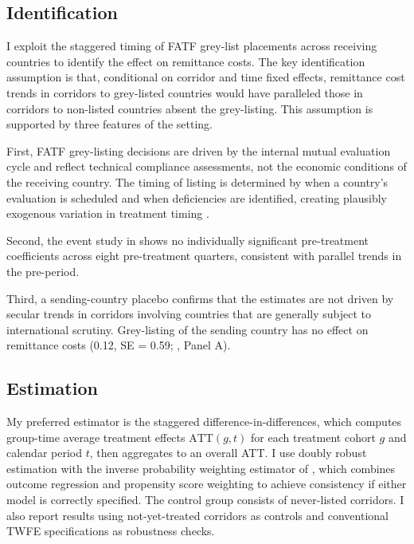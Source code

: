 \documentclass[12pt]{article}
\begin{document}
\subsection{Identification}

I exploit the staggered timing of FATF grey-list placements across receiving countries to identify the effect on remittance costs. The key identification assumption is that, conditional on corridor and time fixed effects, remittance cost trends in corridors to grey-listed countries would have paralleled those in corridors to non-listed countries absent the grey-listing. This assumption is supported by three features of the setting.

First, FATF grey-listing decisions are driven by the internal mutual evaluation cycle and reflect technical compliance assessments, not the economic conditions of the receiving country. The timing of listing is determined by when a country's evaluation is scheduled and when deficiencies are identified, creating plausibly exogenous variation in treatment timing \citep{imf2021wps}.

Second, the event study in  shows no individually significant pre-treatment coefficients across eight pre-treatment quarters, consistent with parallel trends in the pre-period.

Third, a sending-country placebo confirms that the estimates are not driven by secular trends in corridors involving countries that are generally subject to international scrutiny. Grey-listing of the sending country has no effect on remittance costs (0.12, SE = 0.59; , Panel A).

\subsection{Estimation}

My preferred estimator is the \citet{callaway2021} staggered difference-in-differences, which computes group-time average treatment effects $\text{ATT}(g,t)$ for each treatment cohort $g$ and calendar period $t$, then aggregates to an overall ATT. I use doubly robust estimation with the inverse probability weighting estimator of \citet{santanna2020}, which combines outcome regression and propensity score weighting to achieve consistency if either model is correctly specified. The control group consists of never-listed corridors. I also report results using not-yet-treated corridors as controls and conventional TWFE specifications as robustness checks.
\end{document}
